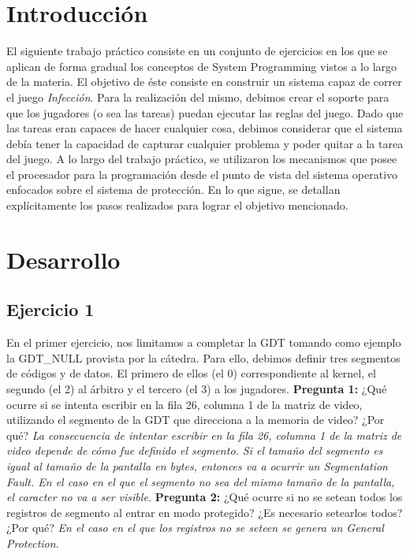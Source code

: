 \documentclass[10pt, a4paper]{article}
\begin{document}
\section{Introducci\'on}
El siguiente trabajo práctico consiste en un conjunto de ejercicios en los que se aplican de forma gradual los conceptos de System Programming vistos a lo largo de la materia. El objetivo de éste consiste en construir un sistema capaz de correr el juego \textit{Infección}. Para la realización del mismo, debimos crear el soporte para que los jugadores (o sea las tareas) puedan ejecutar las reglas del juego. Dado que las tareas eran capaces de hacer cualquier cosa, debimos considerar que el sistema debía tener la capacidad de capturar cualquier problema y poder quitar a la tarea del juego.\newline
A lo largo del trabajo práctico, se utilizaron los mecanismos que posee el procesador para la programación desde el punto de vista del sistema operativo enfocados sobre el sistema de protección. En lo que sigue, se detallan explícitamente los pasos realizados para lograr el objetivo mencionado.

\section{Desarrollo}

\subsection{Ejercicio 1}

En el primer ejercicio, nos limitamos a completar la GDT tomando como ejemplo la GDT\_NULL provista por la cátedra. Para ello, debimos definir tres segmentos de códigos y de datos. El primero de ellos (el 0) correspondiente al kernel, el segundo (el 2) al árbitro y el tercero (el 3) a los jugadores.\newline
\newline
{\textbf{Pregunta 1:}} ¿Qué ocurre si se intenta escribir en la fila 26, columna 1 de la matriz de video, utilizando el segmento de la GDT que direcciona a la memoria de video? ¿Por qué?\newline
\newline
\textit{La consecuencia de intentar escribir en la fila 26, columna 1 de la matriz de video depende de cómo fue definido el segmento. Si el tamaño del segmento es igual al tamaño de la pantalla en bytes, entonces va a ocurrir un Segmentation Fault. En el caso en el que el segmento no sea del mismo tamaño de la pantalla, el caracter no va a ser visible.}\newline
\newline
{\textbf{Pregunta 2:}} ¿Qué ocurre si no se setean todos los registros de segmento al entrar en modo protegido? ¿Es necesario setearlos todos? ¿Por qué?\newline
\textit{En el caso en el que los registros no se seteen se genera un General Protection.}
\end{document}
